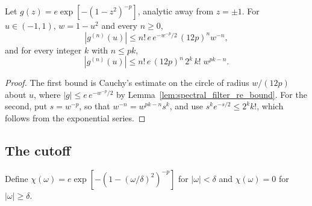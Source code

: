\begin{theorem}
    \label{thm:spectral_filter_profile_cauchy}
    \leanok
    Let $g(z)=e\exp[-(1-z^2)^{-p}]$, analytic away from $z=\pm1$.
    For $u\in(-1,1)$, $w=1-u^2$ and every $n\ge0$,
    \[
        |g^{(n)}(u)|\le n!\,e\,e^{-w^{-p}/2}\,(12p)^n w^{-n},
    \]
    and for every integer $k$ with $n\le pk$,
    \[
        |g^{(n)}(u)|\le n!\,e\,(12p)^n\,2^k\,k!\;w^{pk-n}.
    \]
\end{theorem}
\begin{proof}\leanok
    The first bound is Cauchy's estimate on the circle of radius $w/(12p)$
    about $u$, where $|g|\le e\,e^{-w^{-p}/2}$ by
    Lemma~\ref{lem:spectral_filter_re_bound}. For the second, put
    $s=w^{-p}$, so that $w^{-n}=w^{pk-n}s^k$, and use
    $s^ke^{-s/2}\le 2^k k!$, which follows from the exponential series.
\end{proof}

\subsection{The cutoff}
\label{sec:spectral_filter_cutoff}

\begin{definition}
    \label{def:spectral_cutoff}
    \leanok
    Define $\chi(\omega)=e\exp[-(1-(\omega/\delta)^2)^{-p}]$ for
    $|\omega|<\delta$ and $\chi(\omega)=0$ for $|\omega|\ge\delta$.
\end{definition}

